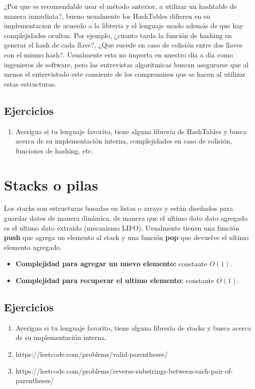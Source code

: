 ¿Por que es recomendable usar el método anterior, a utilizar un hashtable de manera inmediata?, bueno usualmente los HashTables difieren en su implementacion de acuerdo a la libreria y el lenguaje usado además de que hay complejidades ocultas. Por ejemplo, ¿cuanto tarda la función de hashing en generar el hash de cada llave?, ¿Que sucede en caso de colisión entre dos llaves con el mismo hash?. Usualmente esto no importa en nuestro día a día como ingenieros de software, pero las entrevistas algorítmicas buscan asegurarse que al menos el entrevistado este consiente de los compromisos que se hacen al utilizar estas estructuras.

\subsection{Ejercicios}
\begin{enumerate}
    \item Averigua si tu lenguaje favorito, tiene alguna librería de HashTables y busca acerca de su implementación interna, complejidades en caso de colisión, funciones de hashing, etc.
\end{enumerate}

\section{Stacks o pilas}

Los stacks son estructuras basadas en listas o arrays y están diseñados para guardar datos de manera dinámica, de manera que el ultimo dato dato agregado es el ultimo dato extraído (mecanismo LIFO). Usualmente tienen una función \textbf{push} que agrega un elemento al stack y una función \textbf{pop} que devuelve el ultimo elemento agregado.

\begin{itemize}
    \item \textbf{Complejidad para agregar un nuevo elemento:} constante $O(1)$.
    \item \textbf{Complejidad para recuperar el ultimo elemento:} constante $O(1)$.
\end{itemize}

\subsection{Ejercicios}

\begin{enumerate}
    \item Averigua si tu lenguaje favorito, tiene alguna librería de stacks y busca acerca de su implementación interna.
    \item https://leetcode.com/problems/valid-parentheses/
    \item https://leetcode.com/problems/reverse-substrings-between-each-pair-of-parentheses/
\end{enumerate}


